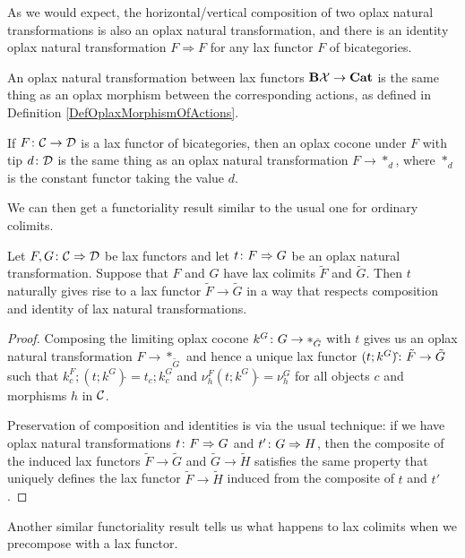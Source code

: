 \documentclass{article}
\begin{document}
As we would expect, the horizontal/vertical composition of two oplax natural transformations is also an oplax natural transformation, and there is an identity oplax natural transformation $F \Rightarrow F$ for any lax functor $F$ of bicategories.

\begin{example}
  An oplax natural transformation between lax functors $\mathbf B\mathcal X \to {\normalfont\textbf{Cat}}$ is the same thing as an oplax morphism between the corresponding actions, as defined in Definition \ref{DefOplaxMorphismOfActions}.
\end{example}
\begin{example}
  If $F\colon {\mathcal{C}} \to {\mathcal{D}}$ is a lax functor of bicategories, then an oplax cocone under $F$ with tip $d\colon {\mathcal{D}}$ is the same thing as an oplax natural transformation $F \to *_d$, where $*_d$ is the constant functor taking the value $d$.
\end{example}

We can then get a functoriality result similar to the usual one for ordinary colimits.

\begin{proposition}
  Let $F,G \colon {\mathcal{C}} \Rightarrow {\mathcal{D}}$ be lax functors and let $t \colon F \Rightarrow G$ be an oplax natural transformation.  
  Suppose that $F$ and $G$ have lax colimits $\tilde{F}$ and $\tilde{G}$.  
  Then $t$ naturally gives rise to a lax functor $\tilde{F} \to \tilde{G}$ in a way that respects composition and identity of lax natural transformations.
  \label{PropFunctorialityOfLaxColimits}
\end{proposition}
\begin{proof}
  Composing the limiting oplax cocone $k^G\colon G \to *_{\tilde{G}}$ with $t$ gives us an oplax natural transformation $F \to *_{\tilde{G}}$ and hence a unique lax functor $(t;k^G)\hat{}\colon \tilde{F} \to \tilde{G}$ such that $k^F_c;(t;k^G)\hat{}=t_c;k^G_c$ and $\nu^F_h(t;k^G)\hat{}=\nu^G_h$ for all objects $c$ and morphisms $h$ in ${\mathcal{C}}$.  

  Preservation of composition and identities is via the usual technique: if we have oplax natural transformations $t\colon F \Rightarrow G$ and $t' \colon G \Rightarrow H$, then the composite of the induced lax functors $\tilde{F} \to \tilde{G}$ and $\tilde{G}\to \tilde{H}$ satisfies the same property that uniquely defines the lax functor $\tilde{F} \to \tilde{H}$ induced from the composite of $t$ and $t'$.
\end{proof}

Another similar functoriality result tells us what happens to lax colimits when we precompose with a lax functor.
\end{document}
